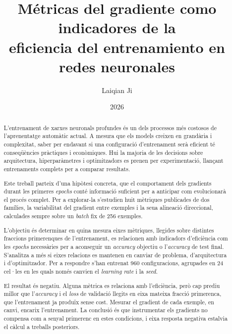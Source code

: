 \documentclass[11pt,spanish,listoffigures,listoftables]{tfgetsinf}
\title{Métricas del gradiente como indicadores de la \\
         eficiencia del entrenamiento en redes neuronales}
\author{Laiqian Ji}
\date{2026}
\begin{document}
\begin{abstract}
L'entrenament de xarxes neuronals profundes és un dels processos més costosos de l'aprenentatge automàtic actual. A mesura que els models creixen en grandària i complexitat, saber per endavant si una configuració d'entrenament serà eficient té conseqüències pràctiques i econòmiques. Hui la majoria de les decisions sobre arquitectura, hiperparàmetres i optimitzadors es prenen per experimentació, llançant entrenaments complets per a comparar resultats.

Este treball parteix d'una hipòtesi concreta, que el comportament dels gradients durant les primeres \emph{epochs} conté informació suficient per a anticipar com evolucionarà el procés complet. Per a explorar-la s'estudien huit mètriques publicades de dos famílies, la variabilitat del gradient entre exemples i la seua alineació direccional, calculades sempre sobre un \emph{batch} fix de 256 exemples.

L'objectiu és determinar en quina mesura eixes mètriques, llegides sobre distintes fraccions primerenques de l'entrenament, es relacionen amb indicadors d'eficiència com les \emph{epochs} necessàries per a aconseguir un \emph{accuracy} objectiu o l'\emph{accuracy} de test final. S'analitza a més si eixes relacions es mantenen en canviar de problema, d'arquitectura i d'optimitzador. Per a respondre s'han entrenat 960 configuracions, agrupades en 24 cel·les en les quals només canvien el \emph{learning rate} i la \emph{seed}.

El resultat és negatiu. Alguna mètrica es relaciona amb l'eficiència, però cap prediu millor que l'\emph{accuracy} i el \emph{loss} de validació llegits en eixa mateixa fracció primerenca, que l'entrenament ja produïx sense cost. Mesurar el gradient de cada exemple, en canvi, encarix l'entrenament. La conclusió és que instrumentar els gradients no compensa com a senyal primerenc en estes condicions, i eixa resposta negativa estalvia el càlcul a treballs posteriors.
\end{abstract}
\end{document}
